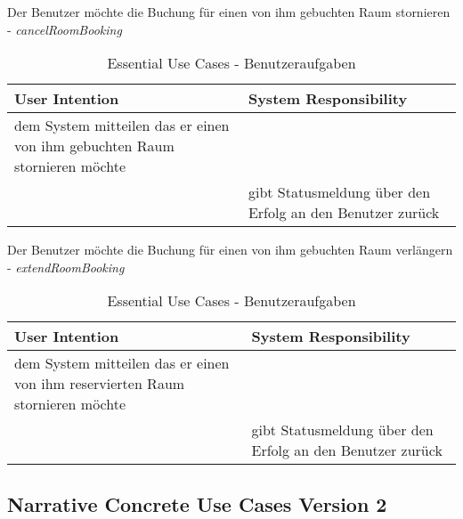\begin{table}[h]	
	\caption{Essential Use Cases - Benutzeraufgaben}
	Der Benutzer möchte die Buchung für einen von ihm gebuchten Raum stornieren - \textit{cancelRoomBooking}\\
	\begin{tabularx}{\textwidth}{|X|X|}
	\rowcolor{heading} \textbf{User Intention} & \textbf{System Responsibility}\\ \hline
	dem System mitteilen das er einen von ihm gebuchten Raum stornieren möchte & \\
	 & gibt Statusmeldung über den Erfolg an den Benutzer zurück \\ \hline
	\end{tabularx}
	
	Der Benutzer möchte die Buchung für einen von ihm gebuchten Raum verlängern - \textit{extendRoomBooking}\\
	\begin{tabularx}{\textwidth}{|X|X|}
	\rowcolor{heading} \textbf{User Intention} & \textbf{System Responsibility}\\ \hline
	dem System mitteilen das er einen von ihm reservierten Raum stornieren möchte & \\
	 & gibt Statusmeldung über den Erfolg an den Benutzer zurück \\ \hline
	\end{tabularx}
\end{table}
\clearpage

\subsection{Narrative Concrete Use Cases Version 2}
\label{anhang:Narrative_Concrete_Use_Cases_v2}

